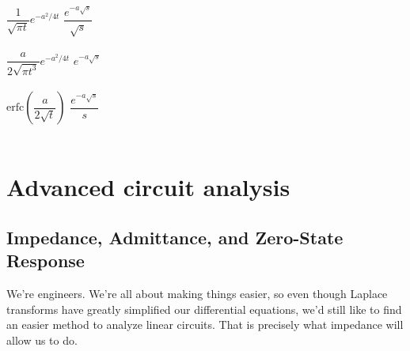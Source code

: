 \documentclass[nobib]{tufte-handout}
\begin{document}
\begin{center}
\begin{table}
\begin{tabbing}
            $\dfrac{1}{\sqrt{\pi t}}e^{-a^2/4t}$	\> $\dfrac{e^{-a\sqrt{s}}}{\sqrt{s}}$ \> \LTNUM \\ \\
            $\dfrac{a}{2\sqrt{\pi t^3}}e^{-a^2/4t}$	\> $e^{-a\sqrt{s}}$ \> \LTNUM \\ \\
            $\text{erfc}\left(\dfrac{a}{2\sqrt{t}}\right)$ \>  $\dfrac{e^{-a\sqrt{s}}}{s}$ \> \LTNUM \\ \\
        \end{tabbing}
    \end{table}
\end{center}

\section{Advanced circuit analysis}

\subsection{Impedance, Admittance, and Zero-State Response}
We're engineers. We're all about 
making things easier, so even 
though Laplace transforms have 
greatly simplified our differential 
equations, we'd still like to 
find an easier method to 
analyze linear circuits. That 
is precisely what impedance will 
allow us to do. 
\end{document}
